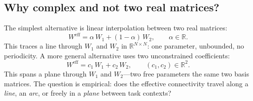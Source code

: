 \documentclass[11pt,a4paper]{article}
\newcommand{\R}{\mathbb{R}}
\newcommand{\Weff}{W^{\text{eff}}}
\begin{document}
{%
\subsection{Why complex and not two real matrices?}
\label{sec:why_complex}

The simplest alternative is linear interpolation between two real 
matrices:
\begin{equation}
\Weff = \alpha\, W_1 + (1-\alpha)\, W_2, \qquad \alpha \in \R.
\label{eq:linear}
\end{equation}
This traces a line through $W_1$ and $W_2$ in $\R^{N\times N}$: 
one parameter, unbounded, no periodicity. A more general alternative 
uses two unconstrained coefficients:
\begin{equation}
\Weff = c_1\, W_1 + c_2\, W_2, \qquad (c_1, c_2) \in \R^2.
\label{eq:real_alternative}
\end{equation}
This spans a plane through $W_1$ and $W_2$---two free parameters 
the same two basis matrices. The question is empirical: does the 
effective connectivity travel along a \emph{line}, an \emph{arc}, 
or freely in a \emph{plane} between task contexts?

}
\end{document}
